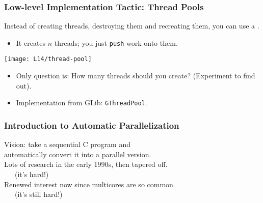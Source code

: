 \documentclass[aspectratio=43]{beamer}
\newenvironment{changemargin}[1]{%
  \begin{list}{}{%
    \setlength{\topsep}{0pt}%
    \setlength{\leftmargin}{#1}%
    \setlength{\rightmargin}{1em}
    \setlength{\listparindent}{\parindent}%
    \setlength{\itemindent}{\parindent}%
    \setlength{\parsep}{\parskip}%
  }%
  \item[]}{\end{list}}
\begin{document}
\begin{frame}
  \frametitle{Low-level Implementation Tactic: Thread Pools}
  
  \begin{changemargin}{2.5cm}
    Instead of creating threads, destroying them and recreating them, you
      can use a .
    \begin{itemize}
    \item It creates $n$ threads; you just {\tt push} work onto them.
    \end{itemize}

  \begin{center}
    \texttt{[image: L14/thread-pool]}
  \end{center}

  \begin{itemize}
    \item Only question is: How many threads should you create? (Experiment to find out).
    \item Implementation from GLib: {\tt GThreadPool}.
  \end{itemize}
  \end{changemargin}

\end{frame}


\begin{frame}
  \frametitle{Introduction to Automatic Parallelization}

  \begin{changemargin}{2.5cm}
    Vision: take a sequential C program and \\ automatically convert it into a parallel version.\\[1em]

    Lots of research in the early 1990s, then tapered off.\\~~~(it's hard!)\\[1em]

    Renewed interest now since multicores are so common.\\~~~(it's still hard!)
  \end{changemargin}
\end{frame}
\end{document}
